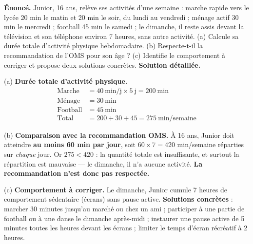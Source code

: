 \documentclass[11pt]{article}
\begin{document}
\begin{exoresolu}
\textbf{Énoncé.} Junior, 16 ans, relève ses activités d'une semaine : marche rapide vers le lycée 20 min le matin et 20 min le soir, du lundi au vendredi ; ménage actif 30 min le mercredi ; football 45 min le samedi ; le dimanche, il reste assis devant la télévision et son téléphone environ 7 heures, sans autre activité. (a) Calcule sa durée totale d'activité physique hebdomadaire. (b) Respecte-t-il la recommandation de l'OMS pour son âge ? (c) Identifie le comportement à corriger et propose deux solutions concrètes.
\tcblower
\textbf{Solution détaillée.}

(a) \textbf{Durée totale d'activité physique.}
\begin{align*}
\text{Marche} &= 40\ \text{min/j} \times 5\ \text{j} = 200\ \text{min} \\
\text{Ménage} &= 30\ \text{min} \\
\text{Football} &= 45\ \text{min} \\
\text{Total} &= 200 + 30 + 45 = 275\ \text{min/semaine}
\end{align*}

(b) \textbf{Comparaison avec la recommandation OMS.} À 16 ans, Junior doit atteindre \textbf{au moins 60 min par jour}, soit $60 \times 7 = 420$ min/semaine réparties sur \emph{chaque} jour. Or $275 < 420$ : la quantité totale est insuffisante, et surtout la répartition est mauvaise — le dimanche, il n'a aucune activité. \textbf{La recommandation n'est donc pas respectée.}

(c) \textbf{Comportement à corriger.} Le dimanche, Junior cumule 7 heures de comportement sédentaire (écrans) sans pause active. \textbf{Solutions concrètes} : marcher 30 minutes jusqu'au marché ou chez un ami ; participer à une partie de football ou à une danse le dimanche après-midi ; instaurer une pause active de 5 minutes toutes les heures devant les écrans ; limiter le temps d'écran récréatif à 2 heures.
\end{exoresolu}
\end{document}
